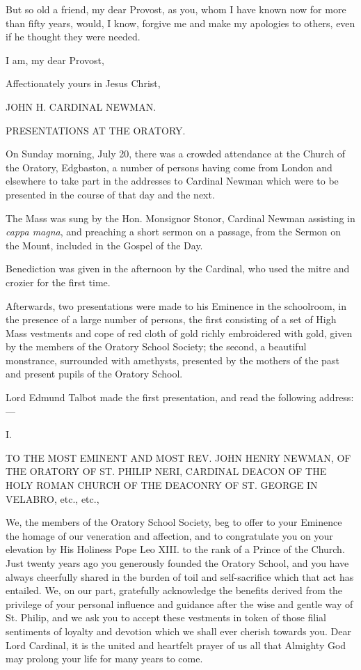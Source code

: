 But so old a friend, my dear Provost, as you, whom I have known now
for more than fifty years, would, I know, forgive me and make my
apologies to others, even if he thought they were needed.

I am, my dear Provost,

Affectionately yours in Jesus Christ,

JOHN H. CARDINAL NEWMAN.


PRESENTATIONS AT THE ORATORY.

On Sunday morning, July 20, there was a crowded attendance at the
Church of the Oratory, Edgbaston, a number of persons having come from
London and elsewhere to take part in the addresses to Cardinal Newman
which were to be presented in the course of that day and the next.

The Mass was sung by the Hon. Monsignor Stonor, Cardinal Newman
assisting in \emph{cappa magna}, and preaching a short sermon on a
passage, from the Sermon on the Mount, included in the Gospel of the
Day.

Benediction was given in the afternoon by the Cardinal, who used
the mitre and crozier for the first time.

Afterwards, two presentations were made to his Eminence in the
schoolroom, in the presence of a large number of persons, the first
consisting of a set of High Mass vestments and cope of red cloth of
gold richly embroidered with gold, given by the members of the Oratory
School Society; the second, a beautiful monstrance, surrounded with
amethysts, presented by the mothers of the
past and present pupils of the Oratory School.

Lord Edmund Talbot made the first presentation, and read the
following address:—

I.


TO THE MOST
EMINENT AND MOST
REV. JOHN HENRY
NEWMAN, OF THE
ORATORY OF ST.
PHILIP NERI, CARDINAL
DEACON OF THE
HOLY ROMAN CHURCH
OF THE DEACONRY
OF ST. GEORGE
IN VELABRO, etc., etc.,

We, the members of the Oratory School Society, beg to offer to your
Eminence the homage of our veneration and affection, and to
congratulate you on your elevation by His Holiness Pope Leo XIII. to
the rank of a Prince of the Church. Just twenty years ago you
generously founded the Oratory School, and you have always cheerfully
shared in the burden of toil and self-sacrifice which that act has
entailed. We, on our part, gratefully acknowledge the benefits derived
from the privilege of your personal influence and guidance after the
wise and gentle way of St. Philip, and we ask you to accept these
vestments in token of those filial sentiments of loyalty and devotion
which we shall ever cherish towards you. Dear Lord Cardinal, it is the
united and heartfelt prayer of us all that Almighty God may prolong
your life for many years to come.

